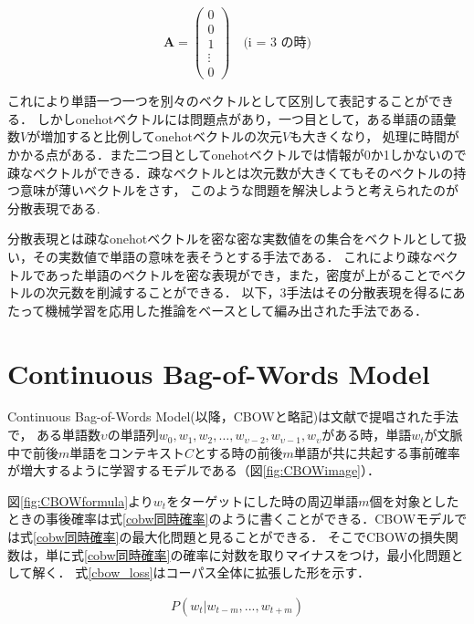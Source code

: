 \documentclass[a4j,11pt,report]{jsbook}
\begin{document}
\begin{equation}
  \label{onehot}
  \bm{A} = \left(
  \begin{array}{c}
    0 \\
    0 \\
    1 \\
    \vdots \\
    0
  \end{array}
  \right)
  \quad \text{(i = 3 の時)}
\end{equation}


これにより単語一つ一つを別々のベクトルとして区別して表記することができる．
しかしonehotベクトルには問題点があり，一つ目として，ある単語の語彙数$V$が増加すると比例してonehotベクトルの次元$V$も大きくなり，
処理に時間がかかる点がある．また二つ目としてonehotベクトルでは情報が0か1しかないので疎なベクトルができる．疎なベクトルとは次元数が大きくてもそのベクトルの持つ意味が薄いベクトルをさす，
このような問題を解決しようと考えられたのが分散表現である.

分散表現とは疎なonehotベクトルを密な密な実数値をの集合をベクトルとして扱い，その実数値で単語の意味を表そうとする手法である．
これにより疎なベクトルであった単語のベクトルを密な表現ができ，また，密度が上がることでベクトルの次元数を削減することができる．
以下，3手法はその分散表現を得るにあたって機械学習を応用した推論をベースとして編み出された手法である．

\clearpage
\section{Continuous Bag-of-Words Model\label{sec:CBOW}}
Continuous Bag-of-Words Model(以降，CBOWと略記)は文献\cite{SkipCBOW}で提唱された手法で，
ある単語数$\upsilon$の単語列$w_{0},w_{1},w_{2},\dots,w_{\upsilon-2},w_{\upsilon-1},w_{\upsilon}$がある時，単語$w_{t}$が文脈中で前後$m$単語をコンテキスト$C$とする時の前後$m$単語が共に共起する事前確率が増大するように学習するモデルである（図\ref{fig:CBOWimage}）．


図\ref{fig:CBOWformula}より$w_{t}$をターゲットにした時の周辺単語$m$個を対象としたときの事後確率は式\ref{cobw同時確率}のように書くことができる．CBOWモデルでは式\ref{cobw同時確率}の最大化問題と見ることができる．
そこでCBOWの損失関数は，単に式\ref{cobw同時確率}の確率に対数を取りマイナスをつけ，最小化問題として解く．
式\ref{cbow_loss}はコーパス全体に拡張した形を示す．



\begin{equation}[tb]
  \label{cobw同時確率}
  \begin{array}{c}
    P(w_{t}|w_{t-m},...,w_{t+m})
  \end{array}
\end{equation}
\end{document}
